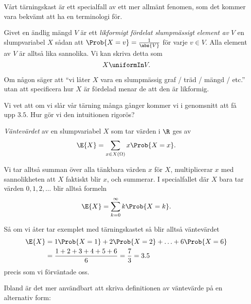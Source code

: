\documentclass[nobib]{tufte-handout}
\begin{document}
Vårt tärningskast är ett specialfall av ett mer allmänt fenomen, som det kommer vara bekvämt att ha en terminologi för.

\begin{definition}
    Givet en ändlig mängd $V$ är ett \emph{likformigt fördelat slumpmässigt element av $V$} en slumpvariabel $X$ sådan att $\Prob{X = v} = \frac{1}{\abs{V}}$ för varje $v\in V$. Alla element av $V$ är alltså lika sannolika. Vi kan skriva detta som
    $$X \uniformIn V.$$

    Om någon säger att ``vi låter $X$ vara en slumpmässig graf / träd / mängd / etc.'' utan att specificera hur $X$ är fördelad menar de att den är likformig.
\end{definition}

Vi vet att om vi slår vår tärning många gånger kommer vi i genomsnitt att få upp $3.5$. Hur gör vi den intuitionen rigorös?

\begin{definition}
    \emph{Väntevärdet} av en slumpvariabel $X$ som tar värden i $\R$ ges av
    $$\E{X} = \sum_{x \in X(\Omega)} x \Prob{X = x}.$$

    Vi tar alltså summan över alla tänkbara värden $x$ för $X$, multiplicerar $x$ med sannolikheten att $X$ faktiskt blir $x$, och summerar. I specialfallet där $X$ bara tar värden $0, 1, 2, \ldots$ blir alltså formeln
    $$\E{X} = \sum_{k=0}^{\infty} k\Prob{X = k}.$$
\end{definition}

\begin{example}
    Så om vi åter tar exemplet med tärningskastet så blir alltså väntevärdet
    \begin{align*}
        \E{X} &= 1\Prob{X = 1} + 2\Prob{X = 2} + \ldots + 6\Prob{X = 6}\\
        &= \frac{1 + 2 + 3 + 4 + 5 + 6}{6} = \frac{7}{3} = 3.5
    \end{align*}
    precis som vi förväntade oss.
\end{example}

Ibland är det mer användbart att skriva definitionen av väntevärde på en alternativ form:
\end{document}
